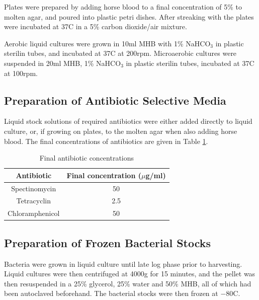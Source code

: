 Plates were prepared by adding horse blood to a final concentration of 5\% to molten agar, and poured into plastic petri dishes. After streaking with \Nm\space the plates were incubated at 37\textdegree C in a 5\% carbon dioxide/air mixture.

Aerobic liquid cultures were grown in 10ml MHB with 1\% NaHCO$_\textrm{3}$ in plastic sterilin tubes, and incubated at 37\textdegree C at 200rpm. Microaerobic cultures were suspended in 20ml MHB, 1\% NaHCO$_\textrm{3}$ in plastic sterilin tubes, incubated at 37\textdegree C at 100rpm.

\subsection{Preparation of Antibiotic Selective Media}
Liquid stock solutions of required antibiotics were either added directly to liquid culture, or, if growing on plates, to the molten agar when also adding horse blood. The final concentrations of antibiotics are given in Table \ref{tab:antibiotic-concs}.

\begin{table}[here]
\begin{center}
\begin{tabular}{cc}
\toprule
\textbf{Antibiotic} & \textbf{Final concentration ($\mu$g/ml)} \\
\midrule
Spectinomycin & 50 \\
Tetracyclin & 2.5 \\
Chloramphenicol & 50 \\
\bottomrule
\end{tabular} 
\end{center}
\caption{Final antibiotic concentrations
\label{tab:antibiotic-concs}}
\end{table}

\subsection{Preparation of Frozen Bacterial Stocks}
Bacteria were grown in liquid culture until late log phase prior to harvesting. Liquid cultures were then centrifuged at 4000g for 15 minutes, and the pellet was then resuspended in a 25\% glycerol, 25\% water and 50\% MHB, all of which had been autoclaved beforehand. The bacterial stocks were then frozen at $-80$\textdegree C.

